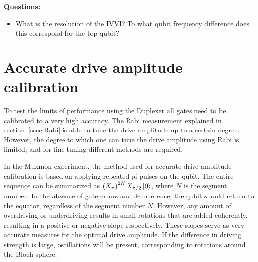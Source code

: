       \textbf{Questions:}
      \begin{itemize}
        \item What is the resolution of the IVVI? To what qubit frequency difference does this correspond for the top qubit?
      \end{itemize}
    \section{Accurate drive amplitude calibration}
      \label{sec:PiX360}
      To test the limits of performance using the Duplexer all gates need to be calibrated to a very high accuracy. The Rabi measurement explained in section~\ref{ssec:Rabi} is able to tune the drive amplitude up to a certain degree. However, the degree to which one can tune the drive amplitude using Rabi is limited, and for fine-tuning different methods are required.

      In the Muxmon experiment, the method used for accurate drive amplitude calibration is based on applying repeated pi-pulses on the qubit. The entire sequence can be summarized as $\left( X_{\pi} \right)^{2N} X_{\pi/2} \ket{0}$, where $N$ is the segment number. In the absence of gate errors and decoherence, the qubit should return to the equator, regardless of the segment number $N$. However, any amount of overdriving or underdriving results in small rotations that are added coherently, resulting in a positive or negative slope respectively. These slopes serve as very accurate measures for the optimal drive amplitude. If the difference in driving strength is large, oscillations will be present, corresponding to rotations around the Bloch sphere.


